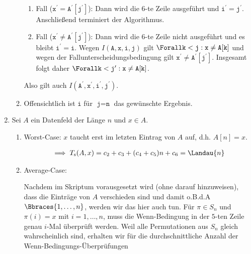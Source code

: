 \begin{solution}
\begin{enumerate}[label = (\alph*)]
\begin{enumerate}[label = \arabic*.]
    \begin{enumerate}[label = \Roman*.]
      
      \item Fall ($\texttt{x}^\prime = \texttt{A}^\prime[\texttt{j}^\prime]$):
      Dann wird die $6$-te Zeile ausgeführt und $\texttt{i}^\prime = \texttt{j}^\prime$.
      Anschließend terminiert der Algorithmus.

      \item Fall ($\texttt{x}^\prime \neq \texttt{A}^\prime[\texttt{j}^\prime]$):
      Dann wird die $6$-te Zeile nicht ausgeführt und es bleibt $\texttt{i}^\prime = \texttt{i}$.
      Wegen $I(\texttt{A}, \texttt{x}, \texttt{i}, \texttt{j})$ gilt $\Forall \texttt{k} < \texttt{j}: \texttt{x} \neq \texttt{A}[\texttt{k}]$ und wegen der Fallunterscheidungsbedingung gilt $\texttt{x}^\prime \neq \texttt{A}^\prime[\texttt{j}^\prime]$.
      Insgesamt folgt daher $\Forall \texttt{k} < \texttt{j}^\prime: \texttt{x} \neq \texttt{A}[\texttt{k}]$.
    \end{enumerate}

    Also gilt auch $I(\texttt{A}^\prime, \texttt{x}^\prime, \texttt{i}^\prime, \texttt{j}^\prime)$.

    \item Offensichtlich ist $\texttt{i}$ für $\texttt{j} = \texttt{n}$ das gewünschte Ergebnis.

  \end{enumerate}

  \item Sei $A$ ein Datenfeld der Länge $n$ und $x \in A$.

  \begin{enumerate}[label = \arabic*.]

    \item Worst-Case:
    $x$ taucht erst im letzten Eintrag von $A$ auf, d.h. $A[n] = x$.

    \begin{align*}
      \implies
      T_{\mathrm{s}}(A, x)
      =
      c_2 + c_3 + (c_4 + c_5) n + c_6
      =
      \Landau{n}
    \end{align*}
  
    \item Average-Case:

    Nachdem im Skriptum vorausgesetzt wird (ohne darauf hinzuweisen), dass die Einträge von $A$ verschieden sind und damit o.B.d.A $\Bbraces{1, \dots, n}$, werden wir das hier auch tun.
    Für $\pi \in S_n$ und $\pi(i) = x$ mit $i = 1, \dots, n$, muss die Wenn-Bedingung in der $5$-ten Zeile genau $i$-Mal überprüft werden.
    Weil alle Permutationen aus $S_n$ gleich wahrscheinlich sind, erhalten wir für die durchschnittliche Anzahl der Wenn-Bedingungs-Überprüfungen
    

\end{enumerate}
\end{enumerate}
\end{solution}
